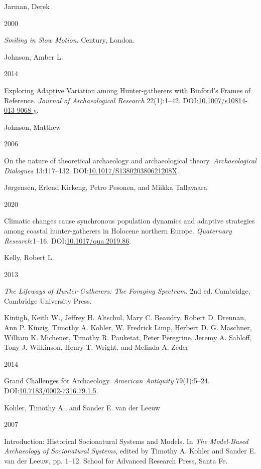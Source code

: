 \documentclass[
  a4paper,
  oneside]{uiophdthesis}
\newlength{\cslhangindent}
\newlength{\csllabelwidth}
\newlength{\cslentryspacingunit} %
\newenvironment{CSLReferences}[2] %
 {%
  \setlength{\parindent}{0pt}
  \ifodd #1
  \let\oldpar\par
  \def\par{\hangindent=\cslhangindent\oldpar}
  \fi
  \setlength{\parskip}{#2\cslentryspacingunit}
 }%
 {}
\newcommand{\CSLBlock}[1]{#1\hfill\break}
\newcommand{\CSLLeftMargin}[1]{\parbox[t]{\csllabelwidth}{#1}}
\newcommand{\CSLRightInline}[1]{\parbox[t]{\linewidth - \csllabelwidth}{#1}\break}
\begin{document}
\begin{CSLReferences}{0}{0}
\leavevmode{}%
\CSLBlock{Jarman, Derek}
\CSLLeftMargin{ 2000}
\CSLRightInline{\emph{{Smiling in Slow Motion}}. Century, London.}

\leavevmode{}%
\CSLBlock{Johnson, Amber L.}
\CSLLeftMargin{ 2014}
\CSLRightInline{{Exploring Adaptive Variation among Hunter-gatherers with Binford's Frames of Reference}. \emph{Journal of Archaeological Research} 22(1):1--42. DOI:\href{https://doi.org/10.1007/s10814-013-9068-y}{10.1007/s10814-013-9068-y}.}

\leavevmode{}%
\CSLBlock{Johnson, Matthew}
\CSLLeftMargin{ 2006}
\CSLRightInline{{On the nature of theoretical archaeology and archaeological theory}. \emph{Archaeological Dialogues} 13:117--132. DOI:\href{https://doi.org/10.1017/S138020380621208X}{10.1017/S138020380621208X}.}

\leavevmode{}%
\CSLBlock{Jørgensen, Erlend Kirkeng, Petro Pesonen, and Miikka Tallavaara}
\CSLLeftMargin{ 2020}
\CSLRightInline{{Climatic changes cause synchronous population dynamics and adaptive strategies among coastal hunter-gatherers in Holocene northern Europe}. \emph{Quaternary Research}:1--16. DOI:\href{https://doi.org/10.1017/qua.2019.86}{10.1017/qua.2019.86}.}

\leavevmode{}%
\CSLBlock{Kelly, Robert L.}
\CSLLeftMargin{ 2013}
\CSLRightInline{\emph{{The Lifeways of Hunter-Gatherers: The Foraging Spectrum}}. 2nd ed. Cambridge, Cambridge University Press.}

\leavevmode{}%
\CSLBlock{Kintigh, Keith W., Jeffrey H. Altschul, Mary C. Beaudry, Robert D. Drennan, Ann P. Kinzig, Timothy A. Kohler, W. Fredrick Limp, Herbert D. G. Maschner, William K. Michener, Timothy R. Pauketat, Peter Peregrine, Jeremy A. Sabloff, Tony J. Wilkinson, Henry T. Wright, and Melinda A. Zeder}
\CSLLeftMargin{ 2014}
\CSLRightInline{{Grand Challenges for Archaeology}. \emph{American Antiquity} 79(1):5--24. DOI:\href{https://doi.org/10.7183/0002-7316.79.1.5}{10.7183/0002-7316.79.1.5}.}

\leavevmode{}%
\CSLBlock{Kohler, Timothy A., and Sander E. van der Leeuw}
\CSLLeftMargin{ 2007}
\CSLRightInline{{Introduction: Historical Socionatural Systems and Models}. In \emph{{The Model-Based Archaeology of Socionatural Systems}}, edited by Timothy A. Kohler and Sander E. van der Leeuw, pp. 1--12. School for Advanced Research Press, Santa Fe.}


\end{CSLReferences}
\end{document}
